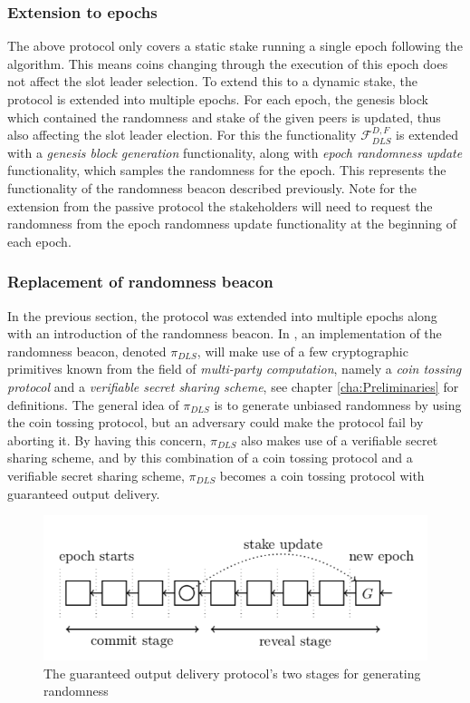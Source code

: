 \subsubsection*{Extension to epochs}
The above protocol only covers a static stake running a single epoch following the algorithm. This means coins changing through the execution of this epoch does not affect the slot leader selection. To extend this to a dynamic stake, the protocol is extended into multiple epochs. For each epoch, the genesis block which contained the randomness and stake of the given peers is updated, thus also affecting the slot leader election. For this the functionality $\mathcal{F}^{D,F}_{DLS}$ is extended with a \emph{genesis block generation} functionality, along with \emph{epoch randomness update} functionality, which samples the randomness for the epoch. This represents the functionality of the randomness beacon described previously. Note for the extension from the passive protocol the stakeholders will need to request the randomness from the epoch randomness update functionality at the beginning of each epoch.

\subsubsection*{Replacement of randomness beacon}
In the previous section, the protocol was extended into multiple epochs along with an introduction of the randomness beacon. In \cite{ouroboros}, an implementation of the randomness beacon, denoted $\pi_{DLS}$, will make use of a few cryptographic primitives known from the field of \emph{multi-party computation}, namely a \emph{coin tossing protocol} and a \emph{verifiable secret sharing scheme}, see chapter \ref{cha:Preliminaries} for definitions. The general idea of $\pi_{DLS}$ is to generate unbiased randomness by using the coin tossing protocol, but an adversary could make the protocol fail by aborting it. By having this concern, $\pi_{DLS}$ also makes use of a verifiable secret sharing scheme, and by this combination of a coin tossing protocol and a verifiable secret sharing scheme, $\pi_{DLS}$ becomes a coin tossing protocol with guaranteed output delivery.

\begin{figure}[H]
    \centering
    \includegraphics[scale=0.75]{images/ouro-commit-reveal.png}
    \caption{The guaranteed output delivery protocol's two stages for generating randomness}
    \label{fig:ouro-commit-reveal}
\end{figure}

